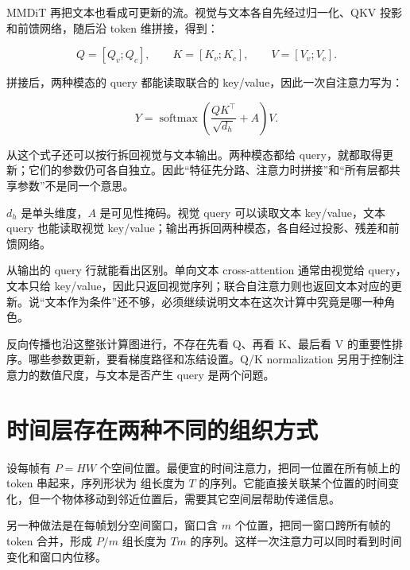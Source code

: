 MMDiT 再把文本也看成可更新的流。视觉与文本各自先经过归一化、QKV 投影和前馈网络，随后沿 token 维拼接，得到：

\[
Q=[Q_v;Q_c],\qquad K=[K_v;K_c],\qquad V=[V_v;V_c].
\]

拼接后，两种模态的 query 都能读取联合的 key/value，因此一次自注意力写为：

\[
Y=\operatorname{softmax}\left(\frac{QK^\top}{\sqrt{d_h}}+A\right)V.
\]

从这个式子还可以按行拆回视觉与文本输出。两种模态都给 query，就都取得更新；它们的参数仍可各自独立。因此“特征先分路、注意力时拼接”和“所有层都共享参数”不是同一个意思。

\(d_h\) 是单头维度，\(A\) 是可见性掩码。视觉 query 可以读取文本 key/value，文本 query 也能读取视觉 key/value；输出再拆回两种模态，各自经过投影、残差和前馈网络。

从输出的 query 行就能看出区别。单向文本 cross-attention 通常由视觉给 query，文本只给 key/value，因此只返回视觉序列；联合自注意力则也返回文本对应的更新。说“文本作为条件”还不够，必须继续说明文本在这次计算中究竟是哪一种角色。

反向传播也沿这整张计算图进行，不存在先看 Q、再看 K、最后看 V 的重要性排序。哪些参数更新，要看梯度路径和冻结设置。Q/K normalization 另用于控制注意力的数值尺度，与文本是否产生 query 是两个问题。

\section{时间层存在两种不同的组织方式}\label{seedance-m03-ux65f6ux95f4ux5c42ux5b58ux5728ux4e24ux79cdux4e0dux540cux7684ux7ec4ux7ec7ux65b9ux5f0f}

设每帧有 \(P=HW\) 个空间位置。最便宜的时间注意力，把同一位置在所有帧上的 token 串起来，序列形状为  组长度为 \(T\) 的序列。它能直接关联某个位置的时间变化，但一个物体移动到邻近位置后，需要其它空间层帮助传递信息。

另一种做法是在每帧划分空间窗口，窗口含 \(m\) 个位置，把同一窗口跨所有帧的 token 合并，形成 \(P/m\) 组长度为 \(Tm\) 的序列。这样一次注意力可以同时看到时间变化和窗口内位移。

